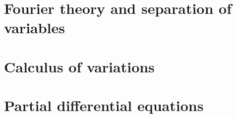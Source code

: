 \documentclass[12pt]{book}
\begin{document}



\tableofcontents

\part{Fourier theory and separation of variables}






\part{Calculus of variations}



\part{Partial differential equations}

%


\end{document}
